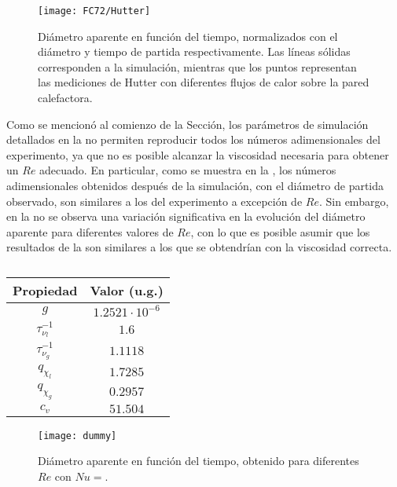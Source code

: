 \begin{figure}[ht]
	\centering
	\texttt{[image: FC72/Hutter]}
	\caption{Di\'ametro aparente en funci\'on del tiempo, normalizados con el di\'ametro y tiempo de partida respectivamente. Las l\'ineas s\'olidas corresponden a la simulaci\'on, mientras que los puntos representan las mediciones de Hutter con diferentes flujos de calor sobre la pared calefactora.}
	\label{fig:d_vs_t}
\end{figure}

Como se mencion\'o al comienzo de la Secci\'on, los par\'ametros de simulaci\'on detallados en la  no permiten reproducir todos los n\'umeros adimensionales del experimento, ya que no es posible alcanzar la viscosidad necesaria para obtener un $Re$ adecuado. En particular, como se muestra en la , los n\'umeros adimensionales obtenidos despu\'es de la simulaci\'on, con el di\'ametro de partida observado, son similares a los del experimento a excepci\'on de $Re$. Sin embargo, en la  no se observa una variaci\'on significativa en la evoluci\'on del di\'ametro aparente para diferentes valores de $Re$, con lo que es posible asumir que los resultados de la  son similares a los que se obtendr\'ian con la viscosidad correcta.

\begin{table}[ht]
	\centering
    \begin{tabular}{c c}
	    \toprule
        \bf Propiedad & \bf Valor (u.g.)\\
        \midrule
		$g$ & $1.2521 \cdot 10^{-6}$\\
		$\tau_{\nu_l}^{-1}$ & $1.6$\\
		$\tau_{\nu_g}^{-1}$ & $1.1118$ \\
		$q_{\chi_l}$ & $1.7285$ \\
		$q_{\chi_g}$ & $0.2957$ \\
		$c_v$ & $51.504$ \\
        \bottomrule
	\end{tabular}
	\caption{}
	\label{tab:adim_reproducidos}
\end{table} 

\begin{figure}[ht]
	\centering
	\texttt{[image: dummy]}
	\caption{Di\'ametro aparente en funci\'on del tiempo, obtenido para diferentes $Re$ con $Nu=$.}
	\label{fig:d_vs_t_Re}
\end{figure}

